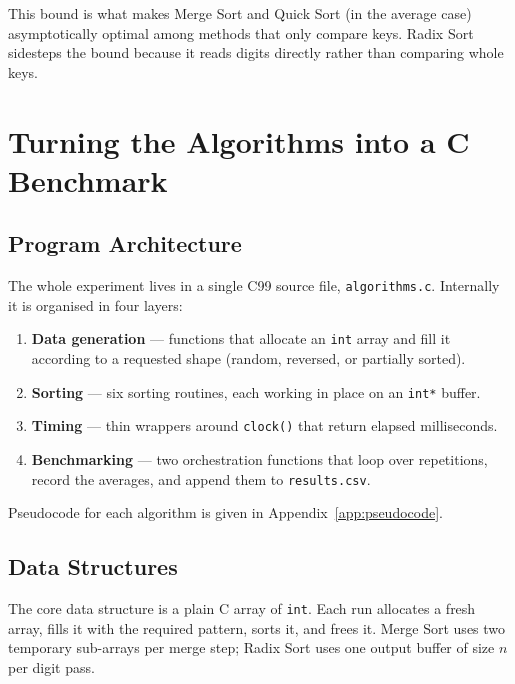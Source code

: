 \documentclass[11pt,a4paper]{article}
\begin{document}
This bound is what makes Merge Sort and Quick Sort (in the average case) asymptotically optimal among methods that only compare keys. Radix Sort sidesteps the bound because it reads digits directly rather than comparing whole keys.

\section{Turning the Algorithms into a C Benchmark}
\label{sec:implementation}

\subsection{Program Architecture}

The whole experiment lives in a single C99 source file, \texttt{algorithms.c}. Internally it is organised in four layers:

\begin{enumerate}[noitemsep]
  \item \textbf{Data generation} --- functions that allocate an \texttt{int} array and fill it according to a requested shape (random, reversed, or partially sorted).
  \item \textbf{Sorting} --- six sorting routines, each working in place on an \texttt{int*} buffer.
  \item \textbf{Timing} --- thin wrappers around \texttt{clock()} that return elapsed milliseconds.
  \item \textbf{Benchmarking} --- two orchestration functions that loop over repetitions, record the averages, and append them to \texttt{results.csv}.
\end{enumerate}

Pseudocode for each algorithm is given in Appendix~\ref{app:pseudocode}.

\subsection{Data Structures}

The core data structure is a plain C array of \texttt{int}. Each run allocates a fresh array, fills it with the required pattern, sorts it, and frees it. Merge Sort uses two temporary sub-arrays per merge step; Radix Sort uses one output buffer of size $n$ per digit pass.
\end{document}
